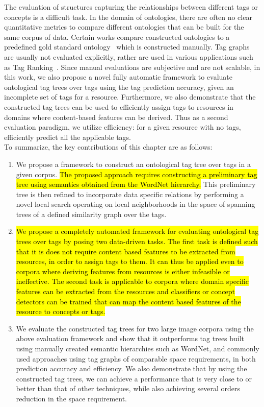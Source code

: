 The evaluation of structures capturing the relationships between different tags or concepts is a difficult task. In the domain of ontologies, there are often no clear quantitative metrics to compare different ontologies that can be built for the same corpus of data. Certain works compare constructed ontologies to a predefined gold standard ontology~\cite{porzel2004task} which is  constructed manually. 
Tag graphs are usually not evaluated explicitly, rather are used in various applications such as Tag Ranking~\cite{liu2009tag}. Since manual evaluations are subjective and are not scalable, in this work, we also propose a novel fully automatic framework to evaluate ontological tag trees over tags using the tag prediction accuracy, given an incomplete set of tags for a resource. 
Furthermore, we also demonstrate that the constructed tag trees can be used to efficiently assign tags to resources in domains where content-based features can be derived. Thus as a second evaluation paradigm, we utilize efficiency: for a given resource with no tags, efficiently predict all the applicable tags.  \\
\indent To summarize, the key contributions of this chapter are as follows:
\begin{enumerate}
	\item We propose a framework to construct an ontological tag tree over tags in a given corpus. \hl{The proposed approach requires constructing a preliminary tag tree using semantics obtained from the WordNet hierarchy.} This preliminary tree is then refined to incorporate data specific relations by performing a novel local search operating on local neighborhoods in the space of spanning trees of a defined similarity graph over the tags. 
	\item \hl{We propose a completely automated framework for evaluating ontological tag trees over tags by posing two data-driven tasks. The first task is defined such that it is does not require content based features to be extracted from resources, in order to assign tags to them. It can thus be applied even to corpora where deriving features from resources is either infeasible or ineffective. The second task is applicable to corpora where domain specific features can be extracted from the resources and classifiers or concept detectors can be trained that can map the content based features of the resource to concepts or tags. 
}
    \item We evaluate the constructed tag trees for two large image corpora using the above evaluation framework and show that it outperforms tag trees built using manually created semantic hierarchies such as WordNet, and commonly used approaches using tag graphs of comparable space requirements, in both prediction accuracy and efficiency. We also demonstrate that by using the constructed tag trees, we can achieve a performance that is very close to or better than that of other techniques, while also achieving several orders reduction in the space requirement. 
\end{enumerate}












